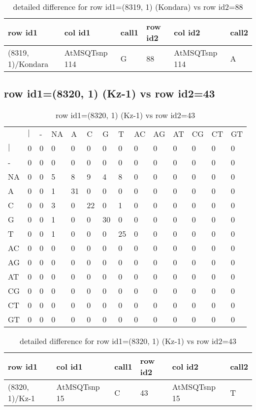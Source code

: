 \begin{center}
\begin{longtable}{|l|l|l|l|l|l|}
\caption{detailed difference for row id1=(8319, 1) (Kondara) vs row id2=88} \label{table_dm511}\\
\hline
row id1&col id1&call1&row id2&col id2&call2\\
\hline
(8319, 1)/Kondara&AtMSQTsnp 114&G&88&AtMSQTsnp 114&A\\
\hline
\end{longtable}
\end{center}

\subsection{row id1=(8320, 1) (Kz-1) vs row id2=43}
\begin{center}
\begin{longtable}{|l|l|l|l|l|l|l|l|l|l|l|l|l|l|}
\caption{row id1=(8320, 1) (Kz-1) vs row id2=43} \label{table_dm512}\\
\hline
\\
\hline
&$|$&-&NA&A&C&G&T&AC&AG&AT&CG&CT&GT\\
$|$&0&0&0&0&0&0&0&0&0&0&0&0&0\\
-&0&0&0&0&0&0&0&0&0&0&0&0&0\\
NA&0&0&5&8&9&4&8&0&0&0&0&0&0\\
A&0&0&1&31&0&0&0&0&0&0&0&0&0\\
C&0&0&3&0&22&0&1&0&0&0&0&0&0\\
G&0&0&1&0&0&30&0&0&0&0&0&0&0\\
T&0&0&1&0&0&0&25&0&0&0&0&0&0\\
AC&0&0&0&0&0&0&0&0&0&0&0&0&0\\
AG&0&0&0&0&0&0&0&0&0&0&0&0&0\\
AT&0&0&0&0&0&0&0&0&0&0&0&0&0\\
CG&0&0&0&0&0&0&0&0&0&0&0&0&0\\
CT&0&0&0&0&0&0&0&0&0&0&0&0&0\\
GT&0&0&0&0&0&0&0&0&0&0&0&0&0\\
\hline
\end{longtable}
\end{center}

\begin{center}
\begin{longtable}{|l|l|l|l|l|l|}
\caption{detailed difference for row id1=(8320, 1) (Kz-1) vs row id2=43} \label{table_dm513}\\
\hline
row id1&col id1&call1&row id2&col id2&call2\\
\hline
(8320, 1)/Kz-1&AtMSQTsnp 15&C&43&AtMSQTsnp 15&T\\
\hline
\end{longtable}
\end{center}

